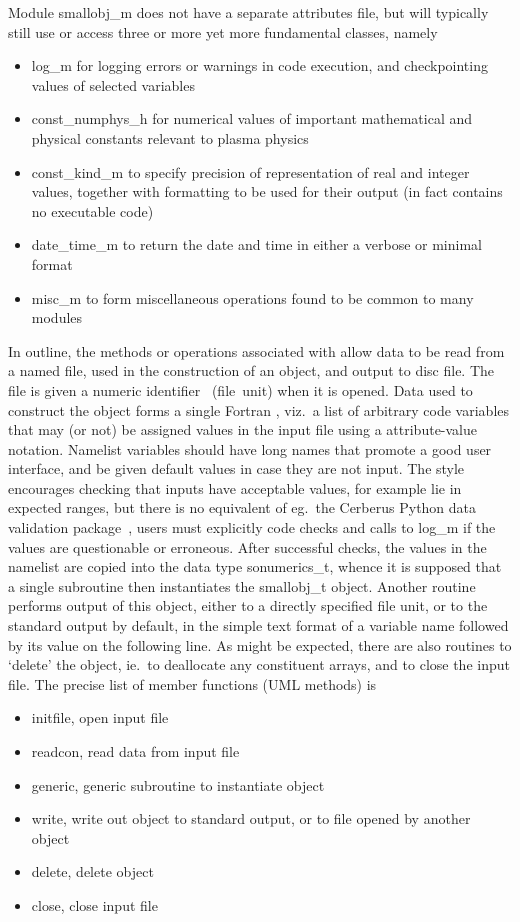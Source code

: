 Module smallobj\_m does not have a separate attributes file, but will typically still use or access
three or more yet more fundamental classes, namely
\begin{itemize}
\item log\_m for logging errors or warnings in code execution, and checkpointing values of selected variables
\item const\_numphys\_h for numerical values of important mathematical and physical constants relevant to plasma physics
\item const\_kind\_m to specify precision of representation of real and integer values, together 
with formatting to be used for their output (in fact contains no executable code)
\item date\_time\_m to return the date and time in either a verbose or minimal format
\item misc\_m to form miscellaneous operations found to be common to many modules
\end{itemize}
In outline, the  methods or operations associated with  allow data to be read from a named file,
used in the construction of an object, and output to disc file. The file is given a numeric identifier~
(file~unit) when it is opened. Data used to construct the  object forms a single Fortran , viz.\ 
a list of arbitrary code variables that may (or not) be assigned values in the input file using a attribute-value notation.
Namelist variables should have long names that promote a good user interface, and
be given default values in case they are not input.
The style encourages checking that inputs have acceptable values, for example lie in expected ranges,
but there is no equivalent of eg.\ the Cerberus Python data validation package~\cite{cerberuswebsite},
users must explicitly code checks and calls
to log\_m if the values are questionable or erroneous. After successful checks, the values in
the namelist are copied into the data type sonumerics\_t, whence it is supposed that a single subroutine then
instantiates the smallobj\_t object. Another routine performs output of this object, either to a directly specified file unit, or
to the standard output by default, in the simple text format of a variable name followed by its value on the following
line. As might be expected, there are also routines to `delete' the object, ie.\ to deallocate
any constituent arrays, and to close the input file.
The precise list of member functions (UML methods) is
\begin{itemize}
\item initfile,  open input file
\item readcon,  read data from input file
\item generic,  generic subroutine to instantiate object
\item write, write out object to standard output, or to file opened by another object
\item delete, delete object
\item close, close input file
\end{itemize}

